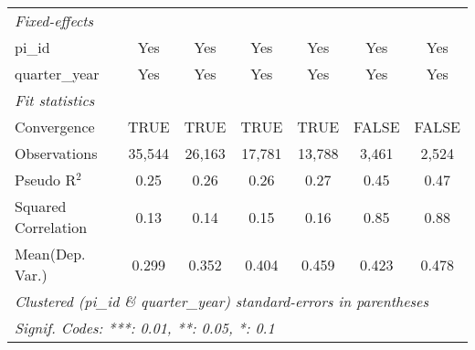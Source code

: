 \begin{tabular}{lcccccc}
   \emph{Fixed-effects}\\
   pi\_id                                                     & Yes            & Yes            & Yes            & Yes            & Yes           & Yes\\  
   quarter\_year                                              & Yes            & Yes            & Yes            & Yes            & Yes           & Yes\\  
   \midrule
   \emph{Fit statistics}\\
   Convergence                                                &TRUE            & TRUE           & TRUE           & TRUE           & FALSE         & FALSE\\  
   Observations                                               & 35,544         & 26,163         & 17,781         & 13,788         & 3,461         & 2,524\\  
   Pseudo R$^2$                                               & 0.25           & 0.26           & 0.26           & 0.27           & 0.45          & 0.47\\  
   Squared Correlation                                        & 0.13           & 0.14           & 0.15           & 0.16           & 0.85          & 0.88\\  
Mean(Dep. Var.) & 0.299 & 0.352 & 0.404 & 0.459 & 0.423 & 0.478 \\
   \midrule \midrule
   \multicolumn{7}{l}{\emph{Clustered (pi\_id \& quarter\_year) standard-errors in parentheses}}\\
   \multicolumn{7}{l}{\emph{Signif. Codes: ***: 0.01, **: 0.05, *: 0.1}}\\
\end{tabular}
\par\endgroup

